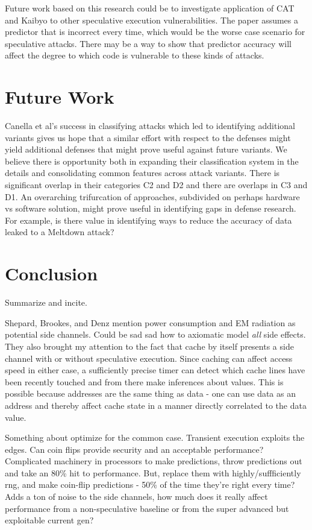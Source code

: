 \documentclass[11pt,conference]{IEEEtran}
\begin{document}
Future work based on this research could be to investigate application of CAT and Kaibyo to other speculative execution vulnerabilities.
The paper assumes a predictor that is incorrect every time, which would be the worse case scenario for speculative attacks.
There may be a way to show that predictor accuracy will affect the degree to which code is vulnerable to these kinds of attacks.



\section{Future Work}\label{sec:future}

Canella et al's success in classifying attacks which led to identifying additional variants gives us hope that a similar effort with respect to the defenses might yield additional defenses that might prove useful against future variants.
We believe there is opportunity both in expanding their classification system in the details and consolidating common features across attack variants.
There is significant overlap in their categories C2 and D2 and there are overlaps in C3 and D1.
An overarching trifurcation of approaches, subdivided on perhaps hardware vs software solution, might prove useful in identifying gaps in defense research.
For example, is there value in identifying ways to reduce the accuracy of data leaked to a Meltdown attack?

\section{Conclusion}
Summarize and incite.

Shepard, Brookes, and Denz \cite{shepherd2022transient} mention power consumption and EM radiation as potential side channels.
Could be sad sad how to axiomatic model \emph{all} side effects.
They also brought my attention to the fact that cache by itself presents a side channel with or without speculative execution.
Since caching can affect access speed in either case, a sufficiently precise timer can detect which cache lines have been recently touched and from there make inferences about values.
This is possible because addresses are the same thing as data - one can use data as an address and thereby affect cache state in a manner directly correlated to the data value.

Something about optimize for the common case.
Transient execution exploits the edges.
Can coin flips provide security and an acceptable performance?
Complicated machinery in processors to make predictions, throw predictions out and take an 80\% hit to performance.
But, replace them with highly/suffficiently rng, and make coin-flip predictions - 50\% of the time they're right every time?
Adds a ton of noise to the side channels, how much does it really affect performance from a non-speculative baseline or from the super advanced but exploitable current gen?
\end{document}
